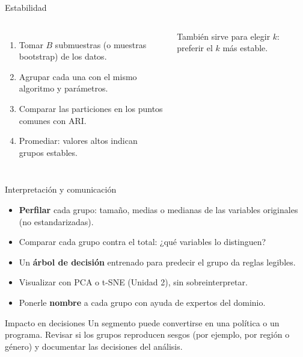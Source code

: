 \documentclass[aspectratio=169,11pt]{beamer}
\begin{document}
\begin{frame}{Estabilidad}
  \begin{columns}[c]
    \begin{enumerate}
      \item Tomar $B$ submuestras (o muestras bootstrap) de los datos.
      \item Agrupar cada una con el mismo algoritmo y parámetros.
      \item Comparar las particiones en los puntos comunes con ARI.
      \item Promediar: valores altos indican grupos estables.
    \end{enumerate}
    \vspace{4pt}
    {\small También sirve para elegir $k$: preferir el $k$ más estable.}
    \centering
  \end{columns}
\end{frame}

\begin{frame}{Interpretación y comunicación}
  \begin{itemize}
    \item \textbf{Perfilar} cada grupo: tamaño, medias o medianas de las variables originales (no estandarizadas).
    \item Comparar cada grupo contra el total: ¿qué variables lo distinguen?
    \item Un \textbf{árbol de decisión} entrenado para predecir el grupo da reglas legibles.
    \item Visualizar con PCA o t-SNE (Unidad 2), sin sobreinterpretar.
    \item Ponerle \textbf{nombre} a cada grupo con ayuda de expertos del dominio.
  \end{itemize}
  \vspace{4pt}
  \begin{alertblock}{Impacto en decisiones}
    Un segmento puede convertirse en una política o un programa. Revisar si los grupos
    reproducen sesgos (por ejemplo, por región o género) y documentar las decisiones del análisis.
  \end{alertblock}
\end{frame}
\end{document}
